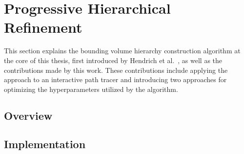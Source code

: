 \section{Progressive Hierarchical Refinement}
This section explains the bounding volume hierarchy construction algorithm at the core of this thesis, first introduced by Hendrich et al.~\cite{hendrich_parallel_2017}, as well as the contributions made by this work. These contributions include applying the approach to an interactive path tracer and introducing two approaches for optimizing the hyperparameters utilized by the algorithm. 
\subsection{Overview}

\subsection{Implementation}